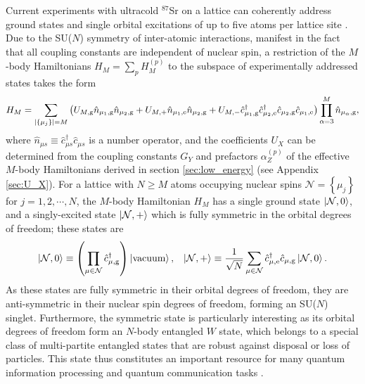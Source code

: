 \documentclass[preprint,showkeys,nofootinbib]{revtex4-1}
\renewcommand{\t}{\text} %
\newcommand{\f}{\dfrac} %
\newcommand{\p}[1]{\left(#1\right)} %
\renewcommand{\set}[1]{\left\{#1\right\}} %
\newcommand{\g}{\text{g}}
\newcommand{\e}{\text{e}}
\renewcommand{\c}{\hat{c}}
\newcommand{\n}{\hat{n}}
\newcommand{\N}{\mathcal{N}}
\newcommand{\1}{\mathds{1}}
\begin{document}
Current experiments with ultracold ${}^{87}$Sr on a lattice can
coherently address ground states and single orbital excitations of up
to five atoms per lattice site \cite{goban2018emergence}.  Due to the
SU($N$) symmetry of inter-atomic interactions, manifest in the fact
that all coupling constants are independent of nuclear spin, a
restriction of the $M$-body Hamiltonians $H_M=\sum_p H_M^{(p)}$ to the
subspace of experimentally addressed states takes the form
\begin{align}
  H_M = \sum_{\abs{\set{\mu_j}}=M}
  \p{U_{M,\g} \n_{\mu_1,\g} \n_{\mu_2,\g}
    + U_{M,+} \n_{\mu_1,\e} \n_{\mu_2,\g}
    + U_{M,-} \c_{\mu_1,\g}^\dag \c_{\mu_2,\e}^\dag
    \c_{\mu_2,\g} \c_{\mu_1,\e}}
  \prod_{\alpha=3}^M \n_{\mu_\alpha,\g},
  \label{eq:H_M}
\end{align}
where $\n_{\mu s}\equiv \c_{\mu s}^\dag\c_{\mu s}$ is a number
operator, and the coefficients $U_X$ can be determined from the
coupling constants $G_Y$ and prefactors $\alpha_Z^{(p)}$ of the
effective $M$-body Hamiltonians derived in section
\ref{sec:low_energy} (see Appendix \ref{sec:U_X}).  For a lattice with
$N\ge M$ atoms occupying nuclear spins $\N=\set{\mu_j}$ for
$j=1,2,\cdots,N$, the $M$-body Hamiltonian $H_M$ has a single ground
state $\ket{\N,0}$, and a singly-excited state $\ket{\N,+}$ which is
fully symmetric in the orbital degrees of freedom; these states are
\begin{align}
  \ket{\N,0}
  \equiv \p{\prod_{\mu\in\N} \c_{\mu,\g}^\dag} \ket{\t{vacuum}},
  &&
  \ket{\N,+} \equiv \f1{\sqrt{N}} \sum_{\mu\in\N}
  \c_{\mu,\e}^\dag \c_{\mu,\g} \ket{\N,0}.
  \label{eq:states_S}
\end{align}
As these states are fully symmetric in their orbital degrees of
freedom, they are anti-symmetric in their nuclear spin degrees of
freedom, forming an SU($N$) singlet.  Furthermore, the symmetric state
is particularly interesting as its orbital degrees of freedom form an
$N$-body entangled $W$ state, which belongs to a special class of
multi-partite entangled states that are robust against disposal or
loss of particles.  This state thus constitutes an important resource
for many quantum information processing and quantum communication
tasks \cite{zang2015generating}.
\end{document}
